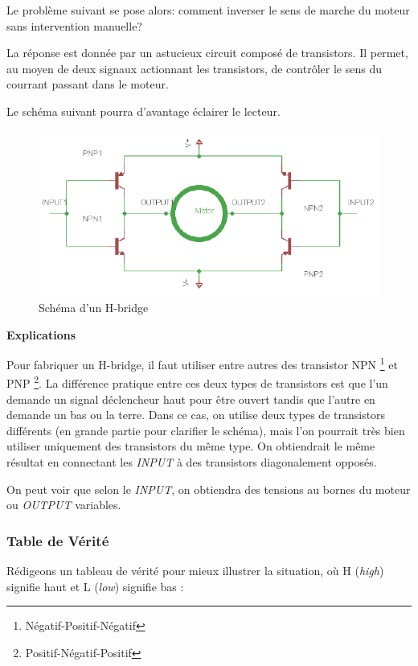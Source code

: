 \documentclass[a4paper,11pt]{report}
\begin{document}
{Le probl\`eme suivant se pose alors: comment inverser le sens de marche du
moteur sans intervention manuelle?

La r\'eponse est donn\'ee par un astucieux circuit compos\'e de
transistors. Il permet, au moyen de deux signaux actionnant les transistors,
de contr\^oler le sens du courrant passant dans le moteur.

Le sch\'ema suivant pourra d'avantage \'eclairer le lecteur.

\begin{figure}[h]
\centering
\includegraphics[width=1.0\textwidth]{figures/H-bridge}
    \caption{\label{H-bridge}Sch\'ema d'un H-bridge}
\end{figure}

\textbf{Explications}

Pour fabriquer un H-bridge, il faut utiliser entre autres des transistor NPN \footnote{Négatif-Positif-Négatif} et PNP \footnote{Positif-Négatif-Positif}.  La diff\'erence pratique
entre ces deux types de transistors est que l'un demande un signal
d\'eclencheur haut pour \^etre ouvert tandis que l'autre en demande un
bas ou la terre. Dans ce cas, on utilise deux types de transistors
diff\'erents (en grande partie pour clarifier le sch\'ema), mais l'on pourrait
tr\`es bien utiliser uniquement des transistors du m\^eme type. On obtiendrait
le m\^eme r\'esultat en connectant les \emph{INPUT} \`a des transistors
diagonalement oppos\'es\cite{RobotRoom}.

On peut voir que selon le \emph{INPUT}, on obtiendra des tensions au bornes du
moteur ou \emph{OUTPUT} variables.
\subsubsection{Table de V\'erit\'e}
R\'edigeons un tableau de v\'erit\'e pour mieux illustrer la situation, o\`u H
(\textit{high}) signifie haut et L (\textit{low}) signifie bas :


}
\end{document}
